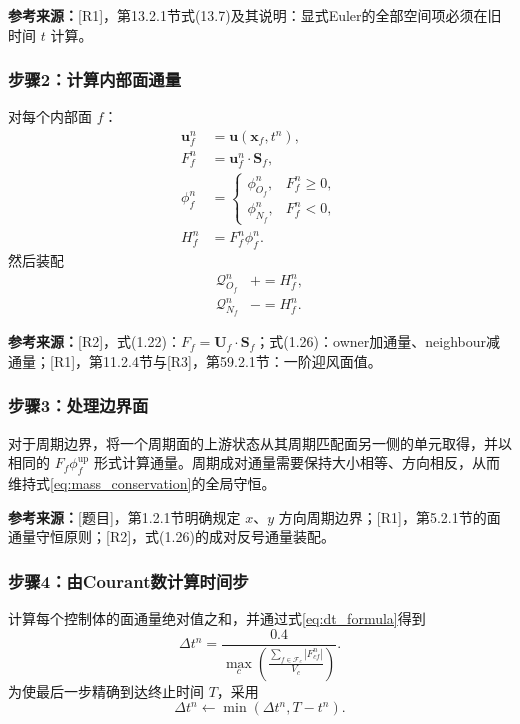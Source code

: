 \documentclass[UTF8,12pt,a4paper]{ctexart}
\numberwithin{equation}{section}
\newcommand{\Rone}{\textnormal{[R1]}}
\newcommand{\Rtwo}{\textnormal{[R2]}}
\newcommand{\Rthree}{\textnormal{[R3]}}
\newcommand{\Task}{\textnormal{[题目]}}
\newcommand{\source}[1]{%
  \par\smallskip
  \noindent\colorbox{sourcebg}{%
    \parbox{0.955\linewidth}{\footnotesize\color{sourcegray}\textbf{参考来源：}#1}%
  }
  \par\smallskip
}
\begin{document}
\source{\Rone，第13.2.1节式(13.7)及其说明：显式Euler的全部空间项必须在旧时间 $t$ 计算。}

\subsubsection*{步骤2：计算内部面通量}

对每个内部面 $f$：
\begin{align}
  \bm u_f^n&=\bm u(\bm x_f,t^n),
  \label{eq:solver_uf}\\
  F_f^n&=\bm u_f^n\cdot\bm S_f,
  \label{eq:solver_F}\\
  \phi_f^n&=
  \begin{cases}
    \phi_{O_f}^n,&F_f^n\ge0,\\
    \phi_{N_f}^n,&F_f^n<0,
  \end{cases}
  \label{eq:solver_face_value}\\
  H_f^n&=F_f^n\phi_f^n.
  \label{eq:solver_H}
\end{align}
然后装配
\begin{align}
  \mathcal Q_{O_f}^n&\mathrel{+}=H_f^n,
  \label{eq:solver_owner}\\
  \mathcal Q_{N_f}^n&\mathrel{-}=H_f^n.
  \label{eq:solver_neighbour}
\end{align}

\source{\Rtwo，式(1.22)：$F_f=\bm U_f\cdot\bm S_f$；式(1.26)：owner加通量、neighbour减通量；\Rone，第11.2.4节与\Rthree，第59.2.1节：一阶迎风面值。}

\subsubsection*{步骤3：处理边界面}

对于周期边界，将一个周期面的上游状态从其周期匹配面另一侧的单元取得，并以相同的 $F_f\phi_f^{\mathrm{up}}$ 形式计算通量。周期成对通量需要保持大小相等、方向相反，从而维持式\eqref{eq:mass_conservation}的全局守恒。

\source{\Task，第1.2.1节明确规定 $x$、$y$ 方向周期边界；\Rone，第5.2.1节的面通量守恒原则；\Rtwo，式(1.26)的成对反号通量装配。}

\subsubsection*{步骤4：由Courant数计算时间步}

计算每个控制体的面通量绝对值之和，并通过式\eqref{eq:dt_formula}得到
\begin{equation}
  \Delta t^n
  =\frac{0.4}{
    \displaystyle
    \max_c\left(
      \frac{\sum_{f\in\mathcal F_c}|F_{cf}^n|}{V_c}
    \right)}.
  \label{eq:solver_dt}
\end{equation}
为使最后一步精确到达终止时间 $T$，采用
\begin{equation}
  \Delta t^n
  \leftarrow
  \min(\Delta t^n,T-t^n).
  \label{eq:last_step}
\end{equation}
\end{document}
